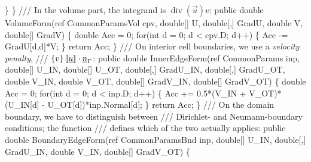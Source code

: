 {\btab \btab \}\newline 
\btab \}\newline 
 \newline 
    /// In the volume part, the integrand is $\operatorname{div}(\vec{u}) v$:
\btab public double VolumeForm(ref CommonParamsVol cpv, \newline 
\btab \btab double[] U, double[,] GradU, \newline 
\btab \btab double V, double[] GradV) \{\newline 
\btab \btab double Acc = 0;\newline 
\btab \btab for(int d = 0; d < cpv.D; d++) \{\newline 
\btab \btab \btab Acc -= GradU[d,d]*V;\newline 
\btab \btab \}\newline 
\btab \btab return Acc;\newline 
\btab \}\newline 
 \newline 
    /// On interior cell boundaries, we use a \emph{velocity penalty},
    /// $\left\{{v}\right\} \left[\!\left[{\underline{u}}\right]\!\right] \cdot \underline{n}_\Gamma$:
\btab public double InnerEdgeForm(ref CommonParams inp, \newline 
\btab \btab double[] U\_IN, double[] U\_OT, double[,] GradU\_IN, double[,] GradU\_OT, \newline 
\btab \btab double V\_IN, double V\_OT, double[] GradV\_IN, double[] GradV\_OT) \{\newline 
 \newline 
\btab \btab double Acc = 0;\newline 
\btab \btab for(int d = 0; d < inp.D; d++) \{\newline 
\btab \btab \btab Acc += 0.5*(V\_IN + V\_OT)*(U\_IN[d] - U\_OT[d])*inp.Normal[d];\newline 
\btab \btab \}\newline 
\btab \btab return Acc;\newline 
\btab \}\newline 
 \newline 
    /// On the domain boundary, we have to distinguish between 
    /// Dirichlet- and Neumann-boundary conditions; the function
    ///  defines which of the two actually applies:
\btab public double BoundaryEdgeForm(ref CommonParamsBnd inp, \newline 
\btab \btab double[] U\_IN, double[,] GradU\_IN, double V\_IN, double[] GradV\_OT) \{\newline 
 \newline 
}
